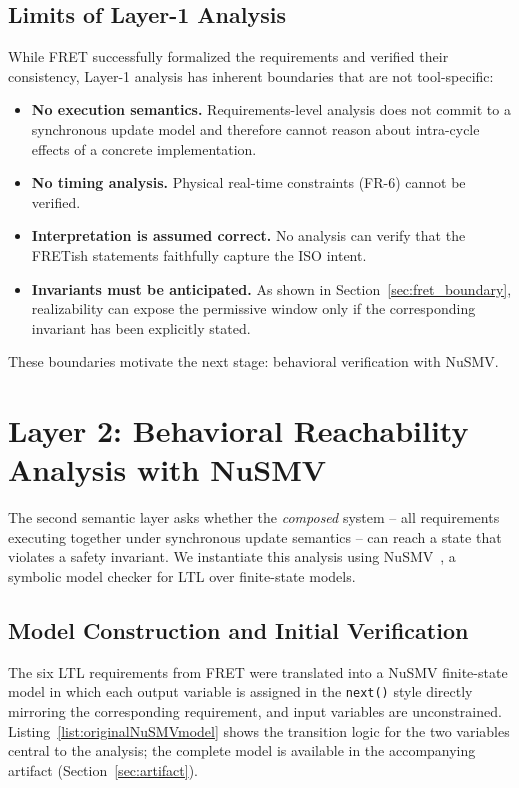 \documentclass{ieeeaccess}
\theoremstyle{definition}
\begin{document}
\subsection{Limits of Layer-1 Analysis}
While FRET successfully formalized the requirements and verified their consistency, Layer-1 analysis has inherent boundaries that are not tool-specific:
\begin{itemize}
\item \textbf{No execution semantics.} Requirements-level analysis does not commit to a synchronous update model and therefore cannot reason about intra-cycle effects of a concrete implementation.
\item \textbf{No timing analysis.} Physical real-time constraints (FR-6) cannot be verified.
\item \textbf{Interpretation is assumed correct.} No analysis can verify that the FRETish statements faithfully capture the ISO intent.
\item \textbf{Invariants must be anticipated.} As shown in Section~\ref{sec:fret_boundary}, realizability can expose the permissive window only if the corresponding invariant has been explicitly stated.
\end{itemize}
These boundaries motivate the next stage: behavioral verification with NuSMV.

\section{Layer 2: Behavioral Reachability Analysis with NuSMV}
\label{sec:nusmv}

The second semantic layer asks whether the \emph{composed} system -- all requirements executing together under synchronous update semantics -- can reach a state that violates a safety invariant. We instantiate this analysis using NuSMV~\cite{Cimatti2002NuSMV}, a symbolic model checker for LTL over finite-state models.

\subsection{Model Construction and Initial Verification}
The six LTL requirements from FRET were translated into a NuSMV finite-state model in which each output variable is assigned in the \texttt{next()} style directly mirroring the corresponding requirement, and input variables are unconstrained. Listing~\ref{list:originalNuSMVmodel} shows the transition logic for the two variables central to the analysis; the complete model is available in the accompanying artifact (Section~\ref{sec:artifact}).
\end{document}
